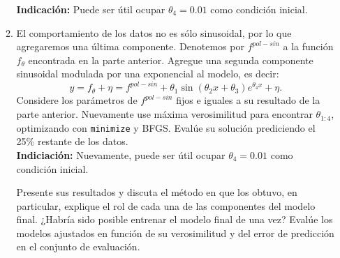 \documentclass[letterpaper,11pt]{article}
\theoremstyle{plain}
\theoremstyle{definition}
\newcommand{\1}{\mathbbm{1}}
\begin{document}
\begin{enumerate}
\begin{enumerate}
    \textbf{Indicación: } Puede ser útil ocupar $\theta_4 = 0.01$ como condición inicial. 
    
    \item El comportamiento de los datos no es sólo sinusoidal, por lo que agregaremos una última componente. Denotemos por $f^{pol-sin}$ a la función $f_{\theta}$ encontrada en la parte anterior. Agregue una segunda componente sinusoidal modulada por una exponencial al modelo, es decir: 
    $$
    y= f_{\theta} +\eta = f^{pol-sin} + \theta_1 \sin(\theta_2 x + \theta_3) e^{\theta_4 x} + \eta.
    $$
    Considere los parámetros de $f^{pol-sin}$ fijos e iguales a su resultado de la parte anterior. Nuevamente use máxima verosimilitud para encontrar $\theta_{1:4}$, optimizando con \texttt{minimize} y BFGS. Evalúe su solución prediciendo el 25\% restante de los datos. \\
    
    \textbf{Indiciación: } Nuevamente, puede ser útil ocupar $\theta_4 = 0.01$ como condición inicial. 
    
    Presente sus resultados y discuta el método en que los obtuvo, en particular, explique el rol de cada una de las componentes del modelo final. ¿Habría sido posible entrenar el modelo final de una vez? Evalúe los modelos ajustados en función de su verosimilitud y del error de predicción en el conjunto de evaluación.
\end{enumerate}

\end{enumerate}
\end{document}
